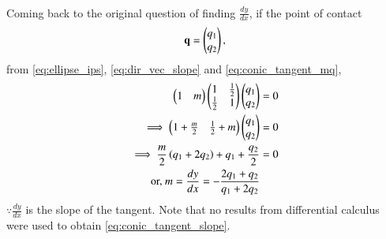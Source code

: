 \begin{enumerate}[label=\thesection.\arabic*.,ref=\thesection.\theenumi]
\begin{align}
\end{align}
Coming back to the original question of finding $\frac{dy}{dx}$,
if the point of contact
\begin{align}
\mathbf{q} = \begin{pmatrix}q_1\\q_2\end{pmatrix},
\end{align}
from \eqref{eq:ellipse_ips},
\eqref{eq:dir_vec_slope}
and \eqref{eq:conic_tangent_mq},
%
\begin{align}
\begin{pmatrix}1 & m\end{pmatrix}\begin{pmatrix}1 & \frac{1}{2} \\ \frac{1}{2} & 1\end{pmatrix}\begin{pmatrix}q_1\\q_2\end{pmatrix} &= 0
\\
\implies \begin{pmatrix}1 + \frac{m}{2} & \frac{1}{2}+m\end{pmatrix}\begin{pmatrix}q_1\\q_2\end{pmatrix} &=0
\\
\implies \frac{m}{2} \left(q_1+2q_2\right) + q_1 + \frac{q_2}{2} &= 0
\\
\text{or, } m = \frac{dy}{dx}= -\frac{2q_1+q_2}{q_1+2q_2}
\label{eq:conic_tangent_slope}
\end{align}
$\because \frac{dy}{dx}$ is the slope of the tangent.
Note that no results from differential calculus were used to obtain \eqref{eq:conic_tangent_slope}.


\end{enumerate}
